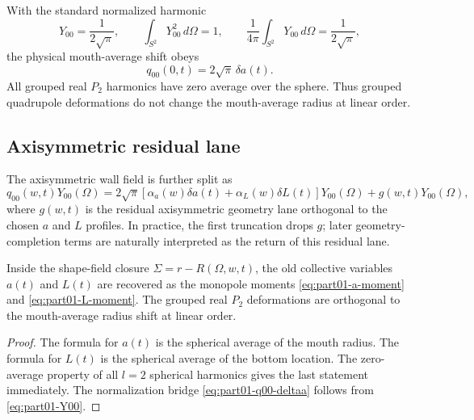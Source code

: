 With the standard normalized harmonic
\begin{equation}
\label{eq:part01-Y00}
Y_{00}=\frac{1}{2\sqrt\pi},
\qquad
\int_{S^2}Y_{00}^2\,d\Omega=1,
\qquad
\frac1{4\pi}\int_{S^2}Y_{00}\,d\Omega=\frac1{2\sqrt\pi},
\end{equation}
the physical mouth-average shift obeys
\begin{equation}
\label{eq:part01-q00-deltaa}
\boxed{
q_{00}(0,t)=2\sqrt\pi\,\delta a(t)}.
\end{equation}
All grouped real \(P_2\) harmonics have zero average over the sphere.  Thus grouped quadrupole deformations do not change the mouth-average radius at linear order.

\subsection{Axisymmetric residual lane}
\label{subsec:part01-axisymmetric-residual-lane}

The axisymmetric wall field is further split as
\begin{equation}
\label{eq:part01-axisymmetric-split}
q_{00}(w,t)Y_{00}(\Omega)
=
2\sqrt\pi\left[\alpha_a(w)\delta a(t)+\alpha_L(w)\delta L(t)\right]Y_{00}(\Omega)
+
g(w,t)Y_{00}(\Omega),
\end{equation}
where \(g(w,t)\) is the residual axisymmetric geometry lane orthogonal to the chosen \(a\) and \(L\) profiles.  In practice, the first truncation drops \(g\); later geometry-completion terms are naturally interpreted as the return of this residual lane.

\begin{proposition}
\label{prop:part01-collective-recovery}
Inside the shape-field closure \(\Sigma=r-R(\Omega,w,t)\), the old collective variables \(a(t)\) and \(L(t)\) are recovered as the monopole moments \eqref{eq:part01-a-moment} and \eqref{eq:part01-L-moment}.  The grouped real \(P_2\) deformations are orthogonal to the mouth-average radius shift at linear order.
\end{proposition}

\begin{proof}
The formula for \(a(t)\) is the spherical average of the mouth radius.  The formula for \(L(t)\) is the spherical average of the bottom location.  The zero-average property of all \(l=2\) spherical harmonics gives the last statement immediately.  The normalization bridge \eqref{eq:part01-q00-deltaa} follows from \eqref{eq:part01-Y00}.
\end{proof}

